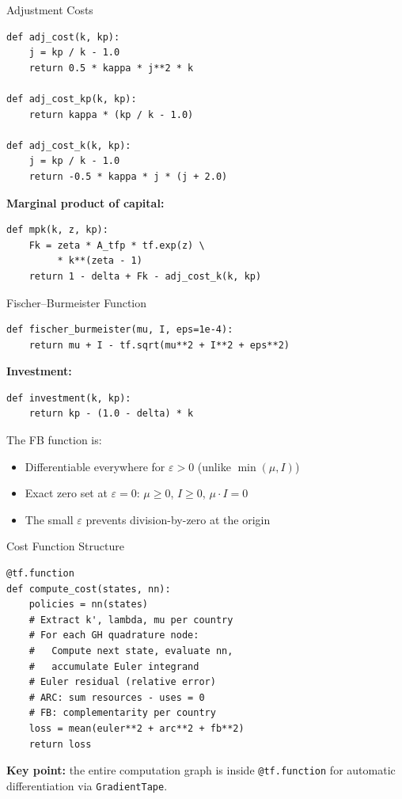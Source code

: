 \documentclass[aspectratio=169,11pt]{beamer}
\newcommand{\emphc}[1]{\textcolor{harvardcrimson}{#1}}
\begin{document}
\begin{frame}[fragile]{Adjustment Costs}
\begin{lstlisting}
def adj_cost(k, kp):
    j = kp / k - 1.0
    return 0.5 * kappa * j**2 * k

def adj_cost_kp(k, kp):
    return kappa * (kp / k - 1.0)

def adj_cost_k(k, kp):
    j = kp / k - 1.0
    return -0.5 * kappa * j * (j + 2.0)
\end{lstlisting}

\vspace{0.3em}
\textbf{Marginal product of capital:}
\begin{lstlisting}
def mpk(k, z, kp):
    Fk = zeta * A_tfp * tf.exp(z) \
         * k**(zeta - 1)
    return 1 - delta + Fk - adj_cost_k(k, kp)
\end{lstlisting}
\end{frame}

\begin{frame}[fragile]{Fischer--Burmeister Function}
\begin{lstlisting}
def fischer_burmeister(mu, I, eps=1e-4):
    return mu + I - tf.sqrt(mu**2 + I**2 + eps**2)
\end{lstlisting}

\vspace{0.3em}
\textbf{Investment:}
\begin{lstlisting}
def investment(k, kp):
    return kp - (1.0 - delta) * k
\end{lstlisting}

\vspace{0.3em}
The FB function is:
\begin{itemize}
    \item \emphc{Differentiable} everywhere for $\varepsilon>0$ (unlike $\min(\mu, I)$)
    \item \emphc{Exact zero set} at $\varepsilon=0$: $\mu \geq 0$, $I \geq 0$, $\mu \cdot I = 0$
    \item The small $\varepsilon$ prevents division-by-zero at the origin
\end{itemize}
\end{frame}

\begin{frame}[fragile]{Cost Function Structure}
\begin{lstlisting}[basicstyle=\footnotesize\ttfamily]
@tf.function
def compute_cost(states, nn):
    policies = nn(states)
    # Extract k', lambda, mu per country
    # For each GH quadrature node:
    #   Compute next state, evaluate nn,
    #   accumulate Euler integrand
    # Euler residual (relative error)
    # ARC: sum resources - uses = 0
    # FB: complementarity per country
    loss = mean(euler**2 + arc**2 + fb**2)
    return loss
\end{lstlisting}

\vspace{0.3em}
\textbf{Key point:} the entire computation graph is inside \texttt{@tf.function} for \emphc{automatic differentiation} via \texttt{GradientTape}.
\end{frame}
\end{document}
